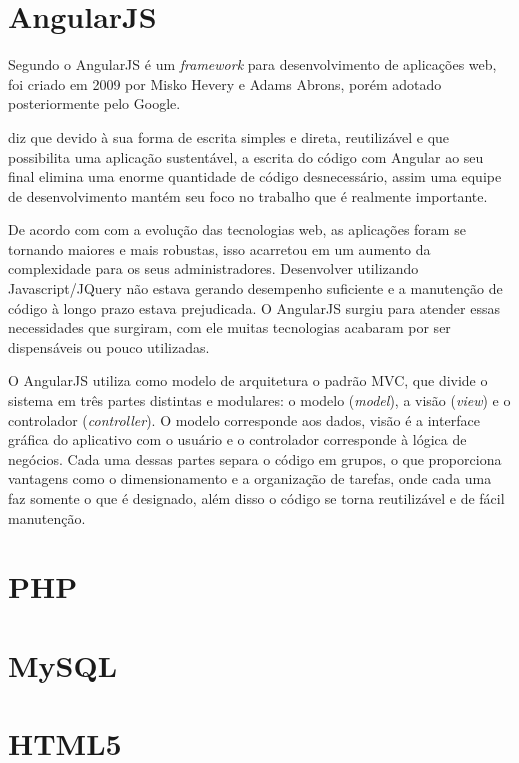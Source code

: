 \section{AngularJS}
	\par Segundo  o AngularJS é um \textit{framework} para desenvolvimento de aplicações web, foi criado em 2009 por Misko Hevery e Adams Abrons, porém adotado posteriormente pelo Google.
	\par {} diz que devido à sua forma de escrita simples e direta, reutilizável e que possibilita uma aplicação sustentável, a escrita do código com Angular ao seu final elimina uma enorme quantidade de código desnecessário, assim uma equipe de desenvolvimento mantém seu foco no trabalho que é realmente importante.
	\par De acordo com  com a evolução das tecnologias web, as aplicações foram se tornando maiores e mais robustas, isso acarretou em um aumento da complexidade para os seus administradores. Desenvolver utilizando Javascript/JQuery não estava gerando desempenho suficiente e a manutenção de código à longo prazo estava prejudicada. O AngularJS surgiu para atender essas necessidades que surgiram, com ele muitas tecnologias acabaram por ser dispensáveis ou pouco utilizadas.
	\par O AngularJS utiliza como modelo de arquitetura o padrão MVC, que divide o sistema em três partes distintas e modulares: o modelo (\textit{model}), a visão (\textit{view}) e o controlador (\textit{controller}). O modelo corresponde aos dados, visão é a interface gráfica do aplicativo com o usuário e o controlador corresponde à lógica de negócios. Cada uma dessas partes separa o código em grupos, o que proporciona vantagens como o dimensionamento e a organização de tarefas, onde cada uma faz somente o que é designado, além disso o código se torna reutilizável e de fácil manutenção. 
	

\section{PHP}

\section{MySQL}

\section{HTML5}
